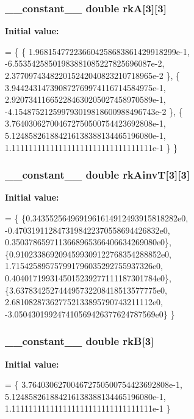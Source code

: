 \subsubsection[{\texorpdfstring{rkA}{rkA}}]{\setlength{\rightskip}{0pt plus 5cm}\+\_\+\+\_\+constant\+\_\+\+\_\+ double rkA\mbox{[}3\mbox{]}\mbox{[}3\mbox{]}}\hypertarget{radau2a_8cu_a0d840116f693430ce6f2ef4d39a4242e}{}\label{radau2a_8cu_a0d840116f693430ce6f2ef4d39a4242e}
{\bfseries Initial value\+:}
\begin{DoxyCode}
= \{ \{
     1.968154772236604258683861429918299e-1,
    -6.55354258501983881085227825696087e-2,
     2.377097434822015242040823210718965e-2
    \}, \{
     3.944243147390872769974116714584975e-1,
     2.920734116652284630205027458970589e-1,
    -4.154875212599793019818600988496743e-2
    \}, \{
     3.764030627004672750500754423692808e-1,
     5.124858261884216138388134465196080e-1,
     1.111111111111111111111111111111111e-1
    \}
\}
\end{DoxyCode}
\subsubsection[{\texorpdfstring{rk\+AinvT}{rkAinvT}}]{\setlength{\rightskip}{0pt plus 5cm}\+\_\+\+\_\+constant\+\_\+\+\_\+ double rk\+AinvT\mbox{[}3\mbox{]}\mbox{[}3\mbox{]}}\hypertarget{radau2a_8cu_a19d86e17b8ed62af599db196b69c1b7a}{}\label{radau2a_8cu_a19d86e17b8ed62af599db196b69c1b7a}
{\bfseries Initial value\+:}
\begin{DoxyCode}
= \{
\{0.3435525649691961614912493915818282e0,
-0.4703191128473198422370558694426832e0,
0.3503786597113668965366406634269080e0\},
\{0.9102338692094599309122768354288852e0,
1.715425895757991796035292755937326e0,
0.4040171993145015239277111187301784e0\},
\{3.637834252744495732208418513577775e0,
2.681082873627752133895790743211112e0,
-3.050430199247410569426377624787569e0\}
\}
\end{DoxyCode}
\subsubsection[{\texorpdfstring{rkB}{rkB}}]{\setlength{\rightskip}{0pt plus 5cm}\+\_\+\+\_\+constant\+\_\+\+\_\+ double rkB\mbox{[}3\mbox{]}}\hypertarget{radau2a_8cu_af1b7e1e9dccdd6c67471dcc6574bbec9}{}\label{radau2a_8cu_af1b7e1e9dccdd6c67471dcc6574bbec9}
{\bfseries Initial value\+:}
\begin{DoxyCode}
= \{
3.764030627004672750500754423692808e-1,
5.124858261884216138388134465196080e-1,
1.111111111111111111111111111111111e-1
\}
\end{DoxyCode}
